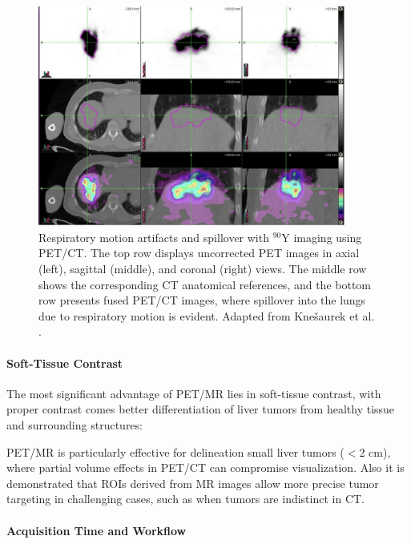 \documentclass[11pt]{article} %
\begin{document}
\begin{multicols}{2}
\begin{figure}[ht]
\centering
\includegraphics[width=0.9\textwidth]{assets/Respiratory_Motion_Artifacts.png} 
\caption{Respiratory motion artifacts and spillover with \(^{90}\text{Y}\) imaging using PET/CT. The top row displays uncorrected PET images in axial (left), sagittal (middle), and coronal (right) views. The middle row shows the corresponding CT anatomical references, and the bottom row presents fused PET/CT images, where spillover into the lungs due to respiratory motion is evident. Adapted from Knešaurek et al. \cite{knesaurek2018}.}
\label{fig:respiratory_motion_artifacts}
\end{figure}



\paragraph{Soft-Tissue Contrast}

The most significant advantage of PET/MR lies in soft-tissue contrast, with proper contrast comes better differentiation of liver tumors from healthy tissue and surrounding structures:

PET/MR is particularly effective for delineation small liver tumors ($<$2 cm), where partial volume effects in PET/CT can compromise visualization. \cite{knesaurek2018} Also it is demonstrated that ROIs derived from MR images allow more precise tumor targeting in challenging cases, such as when tumors are indistinct in CT. 
	

\paragraph{Acquisition Time and Workflow}


\end{multicols}
\end{document}
